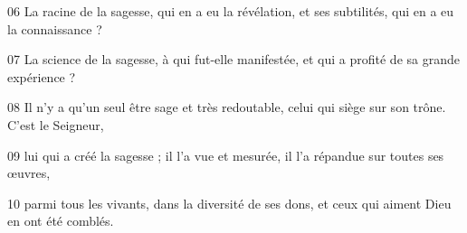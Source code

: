 
06 La racine de la sagesse, qui en a eu la révélation, et ses subtilités, qui en a eu la connaissance ?

07 La science de la sagesse, à qui fut-elle manifestée, et qui a profité de sa grande expérience ?

08 Il n’y a qu’un seul être sage et très redoutable, celui qui siège sur son trône. C’est le Seigneur,

09 lui qui a créé la sagesse ; il l’a vue et mesurée, il l’a répandue sur toutes ses œuvres,

10 parmi tous les vivants, dans la diversité de ses dons, et ceux qui aiment Dieu en ont été comblés.
